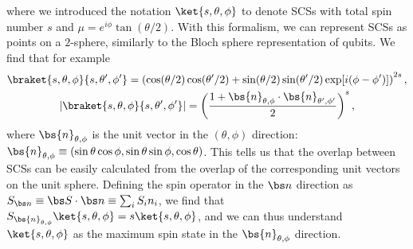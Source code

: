 where we introduced the notation $\ket{s,\theta,\phi}$ to denote SCSs with total spin number $s$ and $\mu=e^{i\phi}\tan(\theta/2)$.
With this formalism, we can represent SCSs as points on a $2$-sphere, similarly to the Bloch sphere representation of qubits.
We find that for example
\newcommand{\bsnangles}{\bs{n}_{\theta,\phi}}
\begin{equation}
\begin{gathered}
    \braket{s,\theta,\phi}{s,\theta',\phi'} = 
    \left( \cos(\theta/2)\cos(\theta'/2) + \sin(\theta/2) \sin(\theta'/2) \exp[i(\phi-\phi')] \right)^{2s}, \\
    \lvert \braket{s,\theta,\phi}{s,\theta',\phi'} \rvert =
    \left( \frac{1 + \bsnangles\cdot\bs{n}_{\theta',\phi'}}{2} \right)^s,
\end{gathered}
\end{equation}
where $\bsnangles$ is the unit vector in the $(\theta,\phi)$ direction:
$\bsnangles\equiv (\sin\theta \cos\phi,\sin\theta\sin\phi,\cos\theta)$.
This tells us that the overlap between SCSs can be easily calculated from the overlap of the corresponding unit vectors on the unit sphere.
Defining the spin operator in the $\bs n$ direction as
$S_{\bs n}\equiv \bs S\cdot \bs n\equiv \sum_i S_i n_i$,
we find that $S_{\bsnangles}\ket{s,\theta,\phi}=s \ket{s,\theta,\phi}$, and we can thus understand $\ket{s,\theta,\phi}$ as the maximum spin state in the $\bsnangles$ direction.

